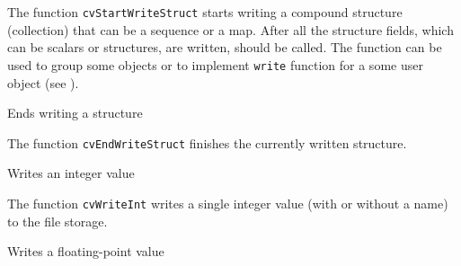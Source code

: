 The function \texttt{cvStartWriteStruct} starts writing a compound
structure (collection) that can be a sequence or a map. After all
the structure fields, which can be scalars or structures, are
written,  should be called. The function can
be used to group some objects or to implement \texttt{write}
function for a some user object (see ).

\label{EndWriteStruct}

Ends writing a structure


\begin{description}
\end{description}


The function \texttt{cvEndWriteStruct} finishes the currently written structure.

\label{WriteInt}

Writes an integer value


\begin{description}
\end{description}

The function \texttt{cvWriteInt} writes a single integer value (with or without a name) to the file storage.

\label{WriteReal}

Writes a floating-point value


\begin{description}
\end{description}

